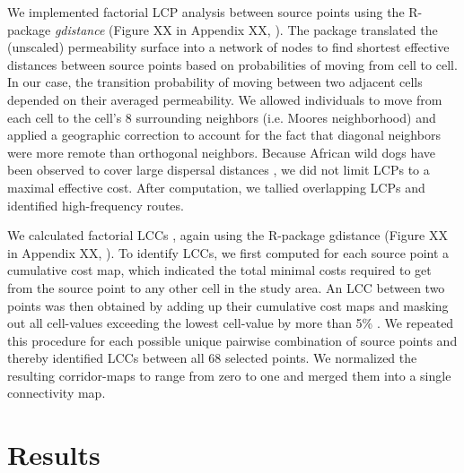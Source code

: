 \documentclass[abstract=on,10pt,a4paper,bibliography=totocnumbered]{article}
\begin{document}
We implemented factorial LCP analysis between source points using the R-package
\textit{gdistance} (Figure XX in Appendix XX, \citealp{vanEtten.2018}). The
package translated the (unscaled) permeability surface into a network of nodes
to find shortest effective distances between source points based on
probabilities of moving from cell to cell. In our case, the transition
probability of moving between two adjacent cells depended on their averaged
permeability. We allowed individuals to move from each cell to the cell's 8
surrounding neighbors (i.e. Moores neighborhood) and applied a geographic
correction to account for the fact that diagonal neighbors were more remote than
orthogonal neighbors. Because African wild dogs have been observed to cover
large dispersal distances \cite{DaviesMostert.2012, Masenga.2016, Cozzi.2020},
we did not limit LCPs to a maximal effective cost. After computation, we tallied
overlapping LCPs and identified high-frequency routes.

We calculated factorial LCCs \cite{Pinto.2009, Sawyer.2011, Elliot.2014}, again
using the R-package gdistance (Figure XX in Appendix XX,
\citealp{vanEtten.2018}). To identify LCCs, we first computed for each source
point a cumulative cost map, which indicated the total minimal costs required to
get from the source point to any other cell in the study area. An LCC between
two points was then obtained by adding up their cumulative cost maps and masking
out all cell-values exceeding the lowest cell-value by more than 5\%
\citep{Pinto.2009}. We repeated this procedure for each possible unique pairwise
combination of source points and thereby identified LCCs between all 68 selected
points. We normalized the resulting corridor-maps to range from zero to one and
merged them into a single connectivity map.

\section{Results}
\end{document}
